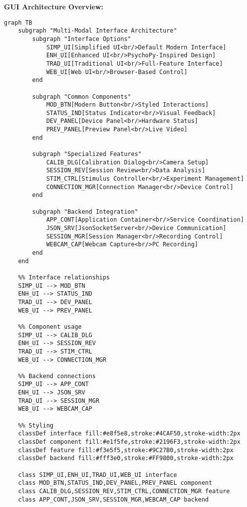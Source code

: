 \documentclass[11pt,a4paper]{article}
\begin{document}
\textbf{GUI Architecture Overview:}

\begin{verbatim}
graph TB
    subgraph "Multi-Modal Interface Architecture"
        subgraph "Interface Options"
            SIMP_UI[Simplified UI<br/>Default Modern Interface]
            ENH_UI[Enhanced UI<br/>PsychoPy-Inspired Design]
            TRAD_UI[Traditional UI<br/>Full-Feature Interface]
            WEB_UI[Web UI<br/>Browser-Based Control]
        end

        subgraph "Common Components"
            MOD_BTN[Modern Button<br/>Styled Interactions]
            STATUS_IND[Status Indicator<br/>Visual Feedback]
            DEV_PANEL[Device Panel<br/>Hardware Status]
            PREV_PANEL[Preview Panel<br/>Live Video]
        end

        subgraph "Specialized Features"
            CALIB_DLG[Calibration Dialog<br/>Camera Setup]
            SESSION_REV[Session Review<br/>Data Analysis]
            STIM_CTRL[Stimulus Controller<br/>Experiment Management]
            CONNECTION_MGR[Connection Manager<br/>Device Control]
        end

        subgraph "Backend Integration"
            APP_CONT[Application Container<br/>Service Coordination]
            JSON_SRV[JsonSocketServer<br/>Device Communication]
            SESSION_MGR[Session Manager<br/>Recording Control]
            WEBCAM_CAP[Webcam Capture<br/>PC Recording]
        end
    end

    %% Interface relationships
    SIMP_UI --> MOD_BTN
    ENH_UI --> STATUS_IND
    TRAD_UI --> DEV_PANEL
    WEB_UI --> PREV_PANEL

    %% Component usage
    SIMP_UI --> CALIB_DLG
    ENH_UI --> SESSION_REV
    TRAD_UI --> STIM_CTRL
    WEB_UI --> CONNECTION_MGR

    %% Backend connections
    SIMP_UI --> APP_CONT
    ENH_UI --> JSON_SRV
    TRAD_UI --> SESSION_MGR
    WEB_UI --> WEBCAM_CAP

    %% Styling
    classDef interface fill:#e8f5e8,stroke:#4CAF50,stroke-width:2px
    classDef component fill:#e1f5fe,stroke:#2196F3,stroke-width:2px
    classDef feature fill:#f3e5f5,stroke:#9C27B0,stroke-width:2px
    classDef backend fill:#fff3e0,stroke:#FF9800,stroke-width:2px

    class SIMP_UI,ENH_UI,TRAD_UI,WEB_UI interface
    class MOD_BTN,STATUS_IND,DEV_PANEL,PREV_PANEL component
    class CALIB_DLG,SESSION_REV,STIM_CTRL,CONNECTION_MGR feature
    class APP_CONT,JSON_SRV,SESSION_MGR,WEBCAM_CAP backend
\end{verbatim}
\end{document}
